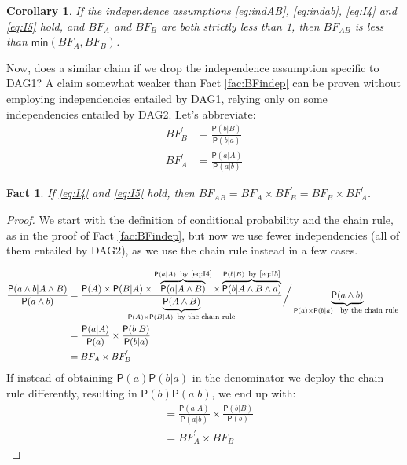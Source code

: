 \documentclass[
  10pt,
  dvipsnames,enabledeprecatedfontcommands]{scrartcl}
\newtheorem{fact}{Fact}
\newcommand{\et}{\wedge}
\newcommand{\pr}[1]{\ensuremath{\mathsf{P}(#1)}}
\newtheorem{corollary}{Corollary}[fact]
\begin{document}
\begin{corollary} If the independence assumptions \eqref{eq:indAB}, \eqref{eq:indab}, \eqref{eq:I4} and \eqref{eq:I5} hold, and $BF_{A}$ and $BF_{B}$ are both strictly less than 1, then $BF_{AB}$  is less than  $\mathsf{min}(BF_{A}, BF_{B})$. \label{cor:BFind3}
\end{corollary}

Now, does a similar claim if we drop the independence assumption
specific to \textsf{DAG1}? A claim somewhat weaker than Fact
\ref{fac:BFindep} can be proven without employing independencies
entailed by \textsf{DAG1}, relying only on some independencies entailed
by \textsf{DAG2}. Let's abbreviate: \begin{align*}
BF^{'}_{B} & = \frac{\pr{b \vert B}}{\pr{b\vert a}} \\
BF^{'}_{A} & = \frac{\pr{a \vert A}}{\pr{a \vert b}}
\end{align*}

\begin{fact} If \eqref{eq:I4} and \eqref{eq:I5}  hold, then $BF_{AB} =  BF_{A}\times BF^{'}_{B}  = BF_{B} \times BF^{'}_{A}$. \label{fac:BFdep}
\end{fact}

\begin{proof}

We start with the definition of conditional probability and the chain rule, as in the proof of Fact \ref{fac:BFindep}, but now we use fewer  independencies (all of them entailed by \textsf{DAG2}), as we use the chain rule instead in a few cases. 

 \begin{align*}
\frac{\pr{a \wedge b\vert A\wedge B}}{\pr{a \wedge b}} &
= \frac{\pr{A} \times \pr {B \vert A}  \times
\overbrace{\pr{a \vert A \et B}}^{\pr{a \vert A} \mbox{\footnotesize \, by \eqref{eq:I4}}}
\times \overbrace{\pr{b \vert A \et B \et a}}^{\pr{b \vert B} \mbox{\footnotesize \, by \eqref{eq:I5}}}
}{\underbrace{\pr{A \et B}}_{\pr{A} \times \pr{B\vert A} \mbox{\footnotesize \, by the chain rule}}} \bigg/ \underbrace{\pr{a \wedge b}}_{\pr{a}\times \pr{b\vert a} \mbox{ \footnotesize \, by the chain rule }}\\
& = \frac{\pr{a \vert A}}{\pr{a}} \times \frac{\pr{b\vert B}}{\pr{b \vert a}}\\
& = BF_{A} \times BF^{'}_{B}
\end{align*}
If instead of obtaining $\pr{a}\pr{b \vert a}$ in the denominator we deploy the chain rule differently, resulting in $\pr{b}\pr{a \vert b}$, we end up with:
\begin{align*}
& = \frac{\pr{a \vert A}}{\pr{a \vert b}} \times \frac{\pr{b\vert B}}{\pr{b}}\\
& = BF^{'}_{A} \times BF_{B}
\end{align*}

\end{proof}
\end{document}
